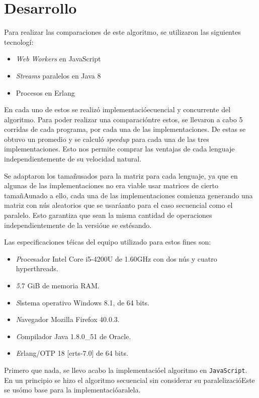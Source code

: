 \documentclass[10pt,letterpaper,oneside]{article}
\begin{document}
{\section{Desarrollo}

Para realizar las comparaciones de este algoritmo, se utilizaron las siguientes tecnologí:

\begin{itemize}
    \item \textit{Web Workers} en JavaScript
    \item \textit{Streams} paralelos en Java 8
    \item Procesos en Erlang
\end{itemize}

En cada uno de estos se realizó implementacióecuencial y concurrente del algoritmo. Para poder realizar una comparacióntre estos, se llevaron a cabo 5 corridas de cada programa, por cada una de las implementaciones. De estas se obtuvo un promedio y se calculó \emph{speedup} para cada una de las tres implementaciones. Esto nos permite comprar las ventajas de cada lenguaje independientemente de su velocidad natural.

Se adaptaron los tamañusados para la matriz para cada lenguaje, ya que en algunas de las implementaciones no era viable usar matrices de cierto tamañAunado a ello, cada una de las implementaciones comienza generando una matriz con nús aleatorios que se usaráanto para el caso secuencial como el paralelo. Esto garantiza que sean la misma cantidad de operaciones independientemente de la versióue se estésando.

Las especificaciones téicas del equipo utilizado para estos fines son:

\begin{itemize}
    \item \textit Procesador Intel Core i5-4200U de 1.60GHz con dos nús y cuatro hyperthreads.
    \item \textit 5.7 GiB de memoria RAM.
    \item \textit Sistema operativo Windows 8.1, de 64 bits.
    \item \textit Navegador Mozilla Firefox 40.0.3.
    \item \textit Compilador Java 1.8.0\_51 de Oracle.
    \item \textit Erlang/OTP 18 [erts-7.0] de 64 bits.
\end{itemize}


Primero que nada, se llevo acabo la implementacióel algoritmo en \verb!JavaScript!. En un principio se hizo el algoritmo secuencial sin considerar su paralelizacióEste se usómo base para la implementacióaralela.

}
\end{document}
